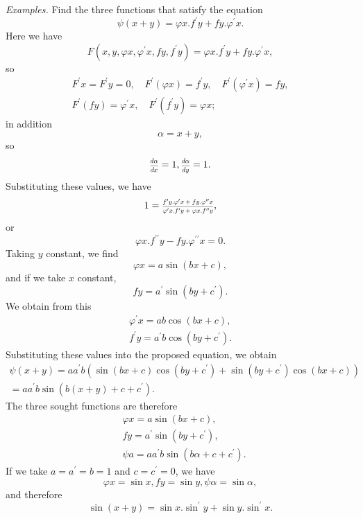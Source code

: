 \documentclass[oneside, 12 pt, leqno]{memoir}
\let\oldfrac\frac
\def\frac#1#2{\mathchoice{\text{\scalebox{.83}{${\oldfrac{#1}{#2}}$}}}{\text{\scalebox{.83}{${\displaystyle\oldfrac{#1}{#2}}$}}}{\genfrac{}{}{}{2}{#1}{#2}}{\genfrac{}{}{}{3}{#1}{#2}}}
\begin{document}
%
\textit{Examples.} Find the three functions that satisfy the equation
\[\psi(x+y)=\varphi x. f^{\prime} y+f y. \varphi^{\prime} x.\]
Here we have
\[F\left(x, y, \varphi x, \varphi^{\prime} x, f y, f^{\prime} y\right)=\varphi x. f^{\prime} y+f y. \varphi^{\prime} x,\]
so
\[\begin{gathered}
F^{\prime} x=F^{\prime} y=0, \quad F^{\prime}(\varphi x)=f^{\prime} y, \quad F^{\prime}\left(\varphi^{\prime} x\right)=f y,\\
F^{\prime}(f y)=\varphi^{\prime} x, \quad F^{\prime}\left(f^{\prime} y\right)=\varphi x;
\end{gathered}\]
in addition
\[\alpha=x+y,\]
so
\[\frac{d \alpha}{d x}=1, \frac{d \alpha}{d y}=1.\]
Substituting these values, we have
\[1=\frac{f^{\prime} y. \varphi^{\prime} x+f y. \varphi^{\prime \prime} x}{\varphi^{\prime} x. f^{\prime} y+\varphi x. f^{\prime \prime} y},\]
or
\[\varphi x. f^{\prime \prime} y-f y. \varphi^{\prime \prime} x=0.\]
Taking \(y\) constant, we find
\[\varphi x=a \sin (b x+c),\]
and if we take \(x\) constant,
\[f y=a^{\prime} \sin \left(b y+c^{\prime}\right).\]
We obtain from this
\[\begin{gathered}
\varphi^{\prime} x=a b \cos (b x+c), \\
f^{\prime} y=a^{\prime} b \cos \left(b y+c^{\prime}\right).
\end{gathered}\]
Substituting these values into the proposed equation, we obtain
\[\begin{gathered}
\psi(x+y)=a a^{\prime} b\left(\sin (b x+c) \cos \left(b y+c^{\prime}\right)+\sin \left(b y+c^{\prime}\right) \cos (b x+c)\right) \\
=a a^{\prime} b \sin \left(b(x+y)+c+c^{\prime}\right).
\end{gathered}
\] %
The three sought functions are therefore
\[\begin{aligned}
& \varphi x=a \sin (b x+c),\\
& f y=a^{\prime} \sin \left(b y+c^{\prime}\right),\\
& \psi a=a a^{\prime} b \sin \left(b \alpha+c+c^{\prime}\right).
\end{aligned}\]
If we take \(a=a^{\prime}=b=1\) and \(c=c^{\prime}=0\), we have
\[\varphi x=\sin x, f y=\sin y, \psi \alpha=\sin \alpha,\]
and therefore
\[ \sin (x+y)=\sin x. \sin ^{\prime} y+\sin y. \sin ^{\prime} x.\]
\end{document}
